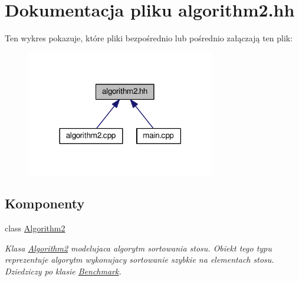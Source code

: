 \hypertarget{algorithm2_8hh}{\section{Dokumentacja pliku algorithm2.\-hh}
\label{algorithm2_8hh}
}
Ten wykres pokazuje, które pliki bezpośrednio lub pośrednio załączają ten plik\-:\nopagebreak
\begin{figure}[H]
\begin{center}
\leavevmode
\includegraphics[width=234pt]{algorithm2_8hh__dep__incl}
\end{center}
\end{figure}
\subsection*{Komponenty}
\begin{DoxyCompactItemize}
\item 
class \hyperlink{class_algorithm2}{Algorithm2}
\begin{DoxyCompactList}\small\item\em Klasa \hyperlink{class_algorithm2}{Algorithm2} modelujaca algorytm sortowania stosu. Obiekt tego typu reprezentuje algorytm wykonujacy sortowanie szybkie na elementach stosu. Dziedziczy po klasie \hyperlink{class_benchmark}{Benchmark}. \end{DoxyCompactList}\end{DoxyCompactItemize}

